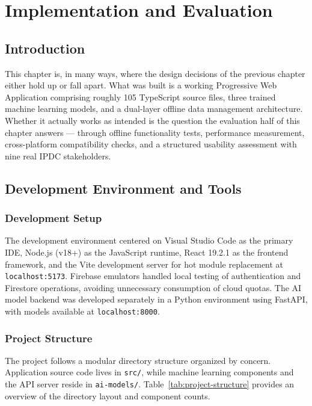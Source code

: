 \chapter{Implementation and Evaluation}

\label{ch:implementation}

\section{Introduction}

This chapter is, in many ways, where the design decisions of the previous chapter either hold up or fall apart. What was built is a working Progressive Web Application comprising roughly 105 TypeScript source files, three trained machine learning models, and a dual-layer offline data management architecture. Whether it actually works as intended is the question the evaluation half of this chapter answers --- through offline functionality tests, performance measurement, cross-platform compatibility checks, and a structured usability assessment with nine real IPDC stakeholders.

\section{Development Environment and Tools}

\subsection{Development Setup}

The development environment centered on Visual Studio Code as the primary IDE, Node.js (v18+) as the JavaScript runtime, React 19.2.1 \citep{React2024} as the frontend framework, and the Vite development server for hot module replacement at \texttt{localhost:5173}. Firebase emulators handled local testing of authentication and Firestore operations, avoiding unnecessary consumption of cloud quotas. The AI model backend was developed separately in a Python environment using FastAPI, with models available at \texttt{localhost:8000}.

\subsection{Project Structure}

The project follows a modular directory structure organized by concern. Application source code lives in \texttt{src/}, while machine learning components and the API server reside in \texttt{ai-models/}. Table~\ref{tab:project-structure} provides an overview of the directory layout and component counts.

